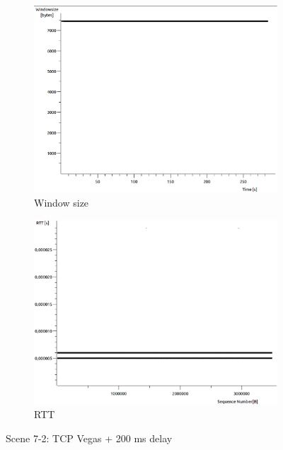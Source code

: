 \documentclass[conference,a4paper]{IEEEtran}
\begin{document}
\begin{figure}
\begin{subfigure}[b]{0.2\textwidth}
  \includegraphics[width=\textwidth]{s7-2_wsize}
  \caption{Window size}
 \end{subfigure}
 \begin{subfigure}[b]{0.2\textwidth}
  \includegraphics[width=\textwidth]{s7-2_rtt}
  \caption{RTT}
 \end{subfigure}
 \caption{Scene 7-2: TCP Vegas + 200 ms delay}
\end{figure}
\end{document}
